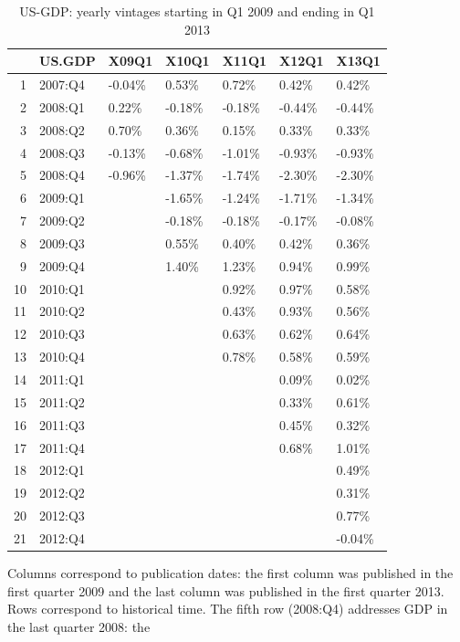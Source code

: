 \documentclass[a4paper]{book}
\begin{document}
\begin{table}[ht]
\centering
\begin{tabular}{rllllll}
  \hline
 & US.GDP & X09Q1 & X10Q1 & X11Q1 & X12Q1 & X13Q1 \\ 
  \hline
1 & 2007:Q4 & -0.04\% & 0.53\% & 0.72\% & 0.42\% & 0.42\% \\ 
  2 & 2008:Q1 & 0.22\% & -0.18\% & -0.18\% & -0.44\% & -0.44\% \\ 
  3 & 2008:Q2 & 0.70\% & 0.36\% & 0.15\% & 0.33\% & 0.33\% \\ 
  4 & 2008:Q3 & -0.13\% & -0.68\% & -1.01\% & -0.93\% & -0.93\% \\ 
  5 & 2008:Q4 & -0.96\% & -1.37\% & -1.74\% & -2.30\% & -2.30\% \\ 
  6 & 2009:Q1 &  & -1.65\% & -1.24\% & -1.71\% & -1.34\% \\ 
  7 & 2009:Q2 &  & -0.18\% & -0.18\% & -0.17\% & -0.08\% \\ 
  8 & 2009:Q3 &  & 0.55\% & 0.40\% & 0.42\% & 0.36\% \\ 
  9 & 2009:Q4 &  & 1.40\% & 1.23\% & 0.94\% & 0.99\% \\ 
  10 & 2010:Q1 &  &  & 0.92\% & 0.97\% & 0.58\% \\ 
  11 & 2010:Q2 &  &  & 0.43\% & 0.93\% & 0.56\% \\ 
  12 & 2010:Q3 &  &  & 0.63\% & 0.62\% & 0.64\% \\ 
  13 & 2010:Q4 &  &  & 0.78\% & 0.58\% & 0.59\% \\ 
  14 & 2011:Q1 &  &  &  & 0.09\% & 0.02\% \\ 
  15 & 2011:Q2 &  &  &  & 0.33\% & 0.61\% \\ 
  16 & 2011:Q3 &  &  &  & 0.45\% & 0.32\% \\ 
  17 & 2011:Q4 &  &  &  & 0.68\% & 1.01\% \\ 
  18 & 2012:Q1 &  &  &  &  & 0.49\% \\ 
  19 & 2012:Q2 &  &  &  &  & 0.31\% \\ 
  20 & 2012:Q3 &  &  &  &  & 0.77\% \\ 
  21 & 2012:Q4 &  &  &  &  & -0.04\% \\ 
   \hline
\end{tabular}
\caption{US-GDP: yearly vintages starting in Q1 2009 and ending in Q1 2013} 
\label{US_GDP}
\end{table}Columns correspond to publication dates: the first column was published in the first quarter 2009 and the last column was published in the first quarter 2013. Rows correspond to historical time. The fifth row (2008:Q4) addresses GDP in the last quarter 2008: the
\end{document}
